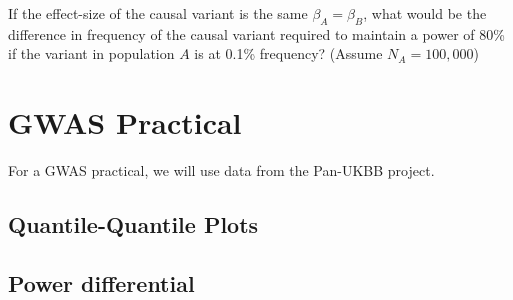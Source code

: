 \documentclass{pset}
\begin{document}
If the effect-size of the causal variant is the same $\beta_A = \beta_B$, what would be the difference in frequency of the causal variant required to maintain a power of 80\% if the variant in population $A$ is at 0.1\% frequency? (Assume $N_A = 100,000$)  


\section*{GWAS Practical}

For a GWAS practical, we will use data from the Pan-UKBB project. 

\subsection*{Quantile-Quantile Plots}



\subsection*{Power differential}



\subsection*{}
\end{document}
